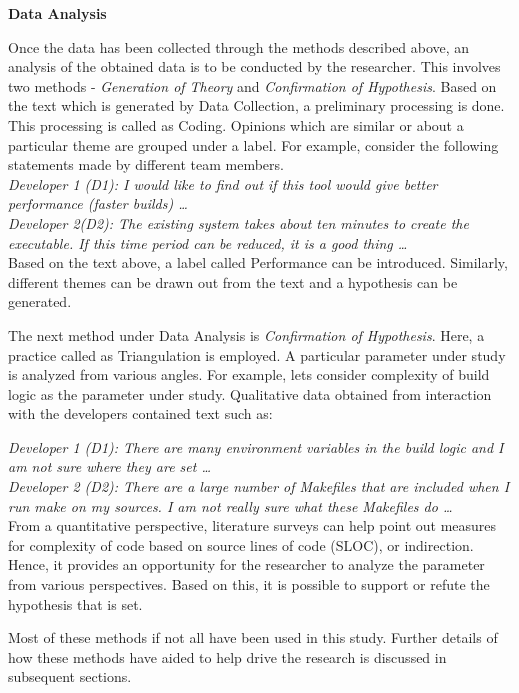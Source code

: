 \documentclass[12pt, a4paper, titlepage]{scrartcl}
\newcommand{\courierword}[1]{\textsf{\itshape #1}}{\fontfamily{pcr}\selectfont}%
\begin{document}
\par \textbf{Data Analysis}
\par Once the data has been collected through the methods described above, an analysis of the obtained data is to be conducted by the researcher. This involves two methods - \textit{Generation of Theory} and \textit{Confirmation of Hypothesis}. Based on the text which is generated by Data Collection, a preliminary processing is done. This processing is called as Coding\cite{wagner2016analysing}. Opinions which are similar or about a particular theme are grouped under a label. For example, consider the following statements made by different team members.\\

\textit{Developer 1 (D1): I would like to find out if this tool would give better performance (faster builds) \ldots \\
Developer 2(D2): The existing system takes about ten minutes to create the executable. If this time period can be reduced, it is a good thing \ldots} \\

Based on the text above, a label called Performance can be introduced. Similarly, different themes can be drawn out from the text and a hypothesis can be generated. 
\par The next method under Data Analysis is \textit{Confirmation of Hypothesis}. Here, a practice called as Triangulation\cite{seaman2009using} is employed. A particular parameter under study is analyzed from various angles. For example, lets consider complexity of build logic as the parameter under study. Qualitative data obtained from interaction with the developers contained text such as: 

\textit{Developer 1 (D1): There are many environment variables in the build logic and I am not sure where they are set \ldots \\
Developer 2 (D2): There are a large number of Makefiles that are included when I run \courierword{make} on my sources. I am not really sure what these Makefiles do \ldots } \\

From a quantitative perspective, literature surveys can help point out measures for complexity of code based on source lines of code (SLOC), or indirection. Hence, it provides an opportunity for the researcher to analyze the parameter from various perspectives. Based on this, it is possible to support or refute the hypothesis that is set. 

\par Most of these methods if not all have been used in this study. Further details of how these methods have aided to help drive the research is discussed in subsequent sections.  
\end{document}
